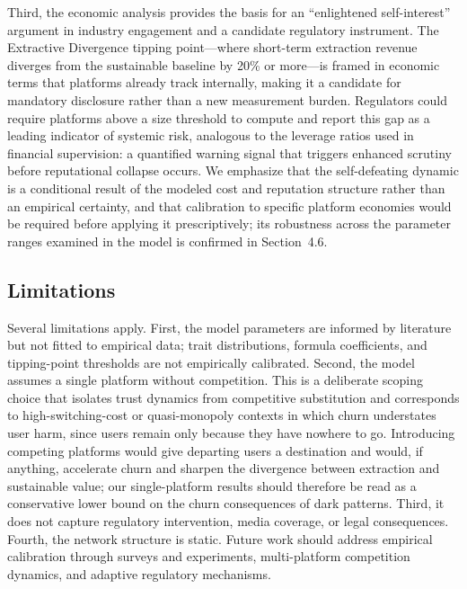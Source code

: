 \documentclass[a4paper]{article}
\begin{document}
Third, the economic analysis provides the basis for an ``enlightened self-interest'' argument in industry engagement and a candidate regulatory instrument. The Extractive Divergence tipping point---where short-term extraction revenue diverges from the sustainable baseline by 20\% or more---is framed in economic terms that platforms already track internally, making it a candidate for mandatory disclosure rather than a new measurement burden. Regulators could require platforms above a size threshold to compute and report this gap as a leading indicator of systemic risk, analogous to the leverage ratios used in financial supervision: a quantified warning signal that triggers enhanced scrutiny before reputational collapse occurs. We emphasize that the self-defeating dynamic is a conditional result of the modeled cost and reputation structure rather than an empirical certainty, and that calibration to specific platform economies would be required before applying it prescriptively; its robustness across the parameter ranges examined in the model is confirmed in Section~4.6.

\subsection{Limitations}
Several limitations apply. First, the model parameters are informed by literature but not fitted to empirical data; trait distributions, formula coefficients, and tipping-point thresholds are not empirically calibrated. Second, the model assumes a single platform without competition. This is a deliberate scoping choice that isolates trust dynamics from competitive substitution and corresponds to high-switching-cost or quasi-monopoly contexts in which churn understates user harm, since users remain only because they have nowhere to go. Introducing competing platforms would give departing users a destination and would, if anything, accelerate churn and sharpen the divergence between extraction and sustainable value; our single-platform results should therefore be read as a conservative lower bound on the churn consequences of dark patterns. Third, it does not capture regulatory intervention, media coverage, or legal consequences. Fourth, the network structure is static. Future work should address empirical calibration through surveys and experiments, multi-platform competition dynamics, and adaptive regulatory mechanisms.

\end{document}
